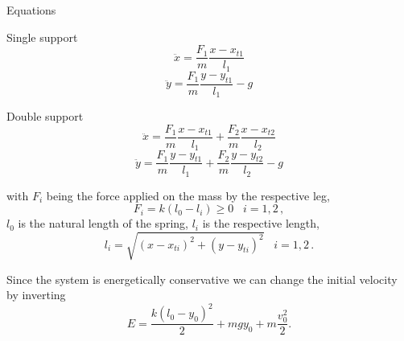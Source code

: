 \documentclass{beamer}
\begin{document}
\begin{frame}{Equations}

  \begin{block}{Single support}
  \begin{equation}
  \ddot{x}=\frac{F_1}{m}\frac{x-x_{t1}}{l_1}
  \label{eq.singlesuppx}
  \end{equation}
\begin{equation}
  \ddot{y}=\frac{F_1}{m}\frac{y-y_{t1}}{l_1}-g
  \label{eq.singlesuppy}
\end{equation}
\end{block}

  \begin{block}{Double support}
\begin{equation}
 \ddot{x}=\frac{F_1}{m}\frac{x-x_{t1}}{l_1}+\frac{F_2}{m}\frac{x-x_{t2}}{l_2}
 \label{eq.doublesuppx}
  \end{equation}
\begin{equation}
  \ddot{y}=\frac{F_1}{m}\frac{y-y_{t1}}{l_1}+\frac{F_2}{m}\frac{y-y_{t2}}{l_2}-g
  \label{eq.doublesuppy}
\end{equation}
\end{block}

\end{frame}

\begin{frame}

with $F_i$ being the force applied on the mass by the respective leg,
\begin{equation}
  F_i=k(l_0-l_i)\geq 0 \,\,\,\,\, i=1,2\,,
\end{equation}
$l_0$ is the natural length of the spring, $l_i$ is the respective length,
\begin{equation}
l_i=\sqrt{(x-x_{ti})^2+(y-y_{ti})^2} \,\,\,\,\, i =1,2 \,.
\end{equation}

Since the system is energetically conservative we can change the initial velocity by inverting
  \begin{equation}
  E=\frac{k (l_0-y_0)^2}{2} + m g y_0 + m \frac{v_0^2}{2}.
\end{equation}

\end{frame}
\end{document}
